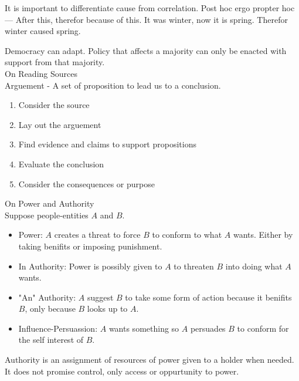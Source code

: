 \documentclass{article}
\begin{document}
\noindent
It is important to differentiate cause from correlation. Post hoc ergo propter hoc --- After this, therefor because of this. It was winter, now it is spring. Therefor winter caused spring.

\noindent
Democracy can adapt. Policy that affects a majority can only be enacted with support from that majority.\\

\noindent
\Large
On Reading Sources\\
\normalsize
\noindent
Arguement - A set of proposition to lead us to a conclusion.

\begin{enumerate}
  \item Consider the source
  \item Lay out the arguement
  \item Find evidence and claims to support propositions
  \item Evaluate the conclusion
  \item Consider the consequences or purpose
\end{enumerate}

\noindent
\Large On Power and Authority\\
\normalsize
\noindent
Suppose people-entities $A$ and $B$.

\centering
{}
\raggedright

\begin{itemize}
  \item Power: $A$ creates a threat to force $B$ to conform to what $A$ wants. Either by taking benifits or imposing punishment.
  \item In Authority: Power is possibly given to $A$ to threaten $B$ into doing what $A$ wants.
  \item "An" Authority: $A$ suggest $B$ to take some form of action because it benifits $B$, only because $B$ looks up to $A$.
  \item Influence-Persuassion: $A$ wants something so $A$ persuades $B$ to conform for the self interest of $B$.
\end{itemize}

\noindent
Authority is an assignment of resources of power given to a holder when needed. It does not promise control, only access or oppurtunity to power.
\end{document}
